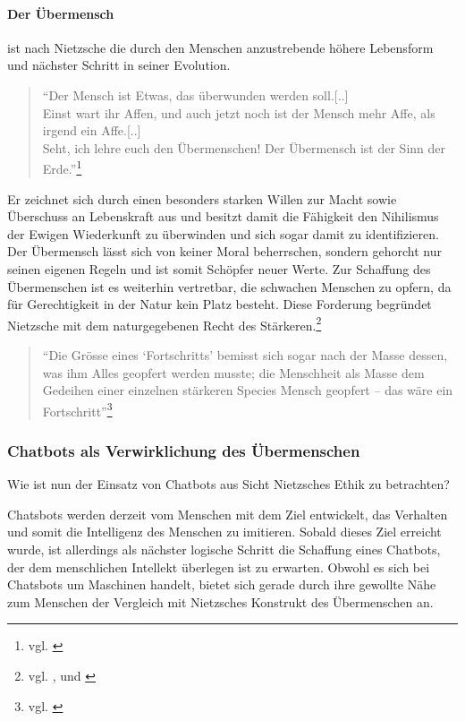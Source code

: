 \paragraph{Der Übermensch} ist nach Nietzsche die durch den Menschen anzustrebende höhere Lebensform und nächster Schritt in seiner Evolution.
\begin{quote}
\enquote{Der Mensch ist Etwas, das überwunden werden soll.[..]\\
Einst wart ihr Affen, und auch jetzt noch ist der Mensch mehr Affe, als irgend ein Affe.[..]\\
Seht, ich lehre euch den Übermenschen! Der Übermensch ist der Sinn der Erde.}\footnote{vgl. \cite{Nietzsche8}}
\end{quote}
Er zeichnet sich durch einen besonders starken Willen zur Macht sowie Überschuss an Lebenskraft aus und besitzt damit die Fähigkeit den Nihilismus der Ewigen Wiederkunft zu überwinden und sich sogar damit zu identifizieren.
Der Übermensch lässt sich von keiner Moral beherrschen, sondern gehorcht nur seinen eigenen Regeln und ist somit Schöpfer neuer Werte.
Zur Schaffung des Übermenschen ist es weiterhin vertretbar, die schwachen Menschen zu opfern, da für Gerechtigkeit in der Natur kein Platz besteht.
Diese Forderung begründet Nietzsche mit dem naturgegebenen Recht des Stärkeren.\footnote{vgl. \cite{Nietzsche9}, \cite{Nietzsche10} und \cite{Nietzsche1}}
\begin{quote}
\enquote{Die Grösse eines \enquote{Fortschritts} bemisst sich sogar nach der Masse dessen, was ihm Alles geopfert werden musste; die Menschheit als Masse dem Gedeihen einer einzelnen stärkeren Species Mensch geopfert – das wäre ein Fortschritt}\footnote{vgl. \cite{Nietzsche11}}
\end{quote}

\subsubsection{Chatbots als Verwirklichung des Übermenschen}
Wie ist nun der Einsatz von Chatbots aus Sicht Nietzsches Ethik zu betrachten?

Chatsbots werden derzeit vom Menschen mit dem Ziel entwickelt, das Verhalten und somit die Intelligenz des Menschen zu imitieren. 
Sobald dieses Ziel erreicht wurde, ist allerdings als nächster logische Schritt die Schaffung eines Chatbots, der dem menschlichen Intellekt überlegen ist zu erwarten. 
Obwohl es sich bei Chatsbots um Maschinen handelt, bietet sich gerade durch ihre gewollte Nähe zum Menschen der Vergleich mit Nietzsches Konstrukt des Übermenschen an.

